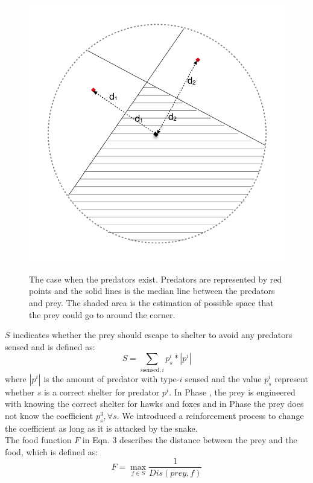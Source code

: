 \documentclass[10pt,conference,letterpaper,doublecolumn]{IEEEtran}
\begin{document}
\begin{figure}[H]
  \centering
  \includegraphics[scale=0.4]{space2.png} \\
  \caption{The case when the predators exist. Predators are represented by red points and the solid lines is the median line between the predators and prey. The shaded area is the estimation of possible space that the prey could go to around the corner. }
  \label{space2}
\end{figure}
$S$ incdicates whether the prey should escape to shelter to avoid any predators sensed and is defined as:
\begin{equation}
S = \sum_{s \text{sensed}, i} p^i_s*\left| p^i \right|
\end{equation}
where $\left| p^i \right|$ is the amount of predator with type-$i$ sensed and the value $p^i_s$ represent whether $s$ is a correct shelter for predator $p^i$. In Phase \uppercase\expandafter{}, the prey is engineered with knowing the correct shelter for hawks and foxes and in  Phase \uppercase\expandafter{} the prey does not know the coefficient $p^3_s, \forall s$. We introduced a reinforcement process to change the coefficient as long as it is attacked by the snake. \\

The food function $F$ in Eqn. 3 describes the distance between the prey and the food, which is defined as:
\begin{equation}
F = \max_{f\in S} \frac{1}{Dis(prey, f)}
\end{equation}
\end{document}

